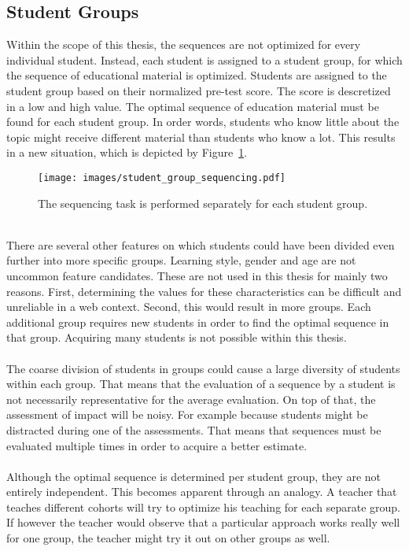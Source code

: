 \subsection{Student Groups}
\label{sec:task_student_groups}
Within the scope of this thesis, the sequences are not optimized for every
individual student. Instead, each student is assigned to a student group, for
which the sequence of educational material is optimized. Students are assigned
to the student group based on their normalized pre-test score. The score is
descretized in a low and high value.  The optimal sequence of education
material must be found for each student group. In order words, students
who know little about the topic might receive different material than students
who know a lot. This results in a new situation, which is depicted by
Figure~\ref{fig:student_group_sequencing}.\\
\begin{figure}[ht]
	\centering
	\texttt{[image: images/student\_group\_sequencing.pdf]}
	\caption[Educational context of the task with student groups]{The
	sequencing task is performed separately for each student group.}
	\label{fig:student_group_sequencing}
\end{figure}\\
\noindent
There are several other features on which students could have been
divided even further into more specific groups. Learning style, gender and age
are not uncommon feature candidates. These are not used in this thesis for
mainly two reasons. First, determining the values for these characteristics can
be difficult and unreliable in a web context. Second, this would result in more
groups. Each additional group requires new students in order to find the
optimal sequence in that group. Acquiring many students is not possible within
this thesis.\\\\
\noindent
The coarse division of students in groups could cause a large diversity of
students within each group. That means that the evaluation of a sequence by a
student is not necessarily representative for the average evaluation. On top of
that, the assessment of impact will be noisy. For example because students
might be distracted during one of the assessments. That means that sequences
must be evaluated multiple times in order to acquire a better estimate.\\\\
\noindent
Although the optimal sequence is determined per student group, they are not
entirely independent. This becomes apparent through an analogy. A teacher that
teaches different cohorts will try to optimize his teaching for each
separate group. If however the teacher would observe that a particular approach
works really well for one group, the teacher might try it out on other groups
as well.


